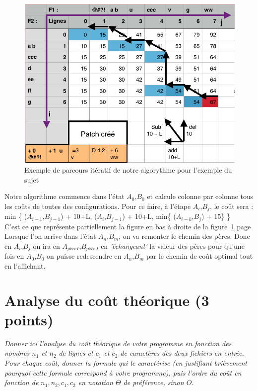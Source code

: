 \documentclass[a4paper, 10pt, french]{article}
\begin{document}
{\begin{figure}[!h]
\hspace{2cm}
	\includegraphics[scale=0.5]{tableau_mem.png}
	\caption{\label{étiquette} Exemple de parcours itératif de notre algorythme pour l'exemple du sujet}
\end{figure}
 \indent Notre algorithme commence dans l'état $A_0$,$B_0$ et calcule colonne par colonne tous les coûts de toutes des configurations. Pour ce faire, à l'étape $A_i$,$B_j$, le coût sera : \\ min \{ ($A_{i-1}$,$B_{j-1}$) + 10+L, ($A_i$,$B_{j-1}$) + 10+L, min\{ ($A_{i-k}$,$B_j$) + 15\} \}
 \\ C'est ce que représente partiellement la figure en bas à droite de la figure~\ref{étiquette} page~\pageref{étiquette} 
 \\ \indent Lorsque l'on arrive dans l'état $A_n$,$B_m$, on va remonter le chemin des pères. Donc en $A_i$,$B_j$ on ira en $A_{péreI}$,$B_{péreJ}$ en {\em 'échangeant'} la valeur des pères pour qu'une fois en $A_0$,$B_0$ on puisse redescendre en $A_n$,$B_m$ par le chemin de coût optimal tout en l'affichant.
 } 

\section{Analyse du coût théorique (3 points)}
{\em Donner ici l'analyse du coût théorique de votre programme en fonction des nombres $n_1$ et $n_2$ de lignes 
et $c_1$ et $c_2$ de caractères des deux fichiers en entrée.
 Pour chaque coût, donner la formule qui le caractérise (en justifiant brièvement pourquoi cette formule correspond à votre programme), 
 puis l'ordre du coût en fonction de $n_1, n_2, c_1, c_2$ en notation $\Theta$ de préférence, sinon $O$.}
\end{document}
